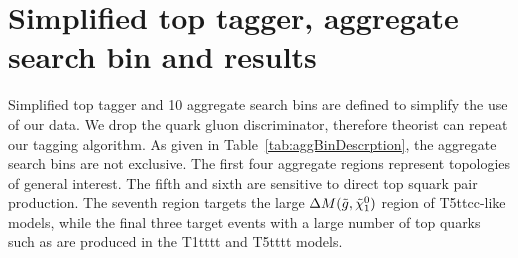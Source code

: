 \clearpage
\section{Simplified top tagger, aggregate search bin and results}

Simplified top tagger and 10 aggregate search bins are defined to simplify the use of our data. We drop the quark gluon discriminator, therefore theorist can repeat our tagging algorithm. As given in Table~\ref{tab:aggBinDescrption}, the aggregate search bins are not exclusive. The first four aggregate regions represent topologies of general interest. The fifth and sixth are sensitive to direct top squark pair production. The seventh region targets the large $\Delta M(\tilde{g},\tilde{\chi}^{0}_{1})$ region of T5ttcc-like models, while the final three target events with a large number of top quarks such as are produced in the T1tttt and T5tttt models.

